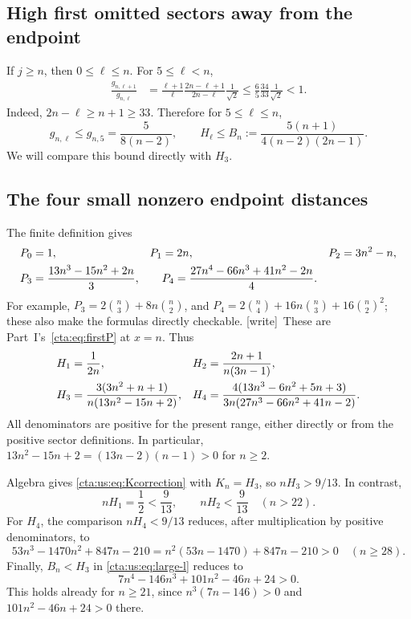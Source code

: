 \documentclass[11pt]{article}
\theoremstyle{definition}
\theoremstyle{remark}
\newcommand{\wtag}{\textup{[write]}}
\begin{document}
\subsection{High first omitted sectors away from the endpoint}
If $j\ge n$, then $0\le\ell\le n$. For $5\le\ell<n$,
\begin{align}\label{cta:us:eq:g-decreasing}
 \frac{g_{n,\ell+1}}{g_{n,\ell}}
 &=\frac{\ell+1}{\ell}\frac{2n-\ell+1}{2n-\ell}\frac1{\sqrt2}
 \le\frac65\frac{34}{33}\frac1{\sqrt2}<1.
\end{align}
Indeed, $2n-\ell\ge n+1\ge33$. Therefore for $5\le\ell\le n$,
\begin{equation}\label{cta:us:eq:large-l}
 g_{n,\ell}\le g_{n,5}=\frac5{8(n-2)},\qquad
 H_\ell\le B_n:=\frac{5(n+1)}{4(n-2)(2n-1)}.
\end{equation}
We will compare this bound directly with $H_3$.

\subsection{The four small nonzero endpoint distances}
The finite definition gives
\begin{align}\label{cta:us:eq:first-five}
 P_0&=1,& P_1&=2n,& P_2&=3n^2-n,\notag\\
 P_3&=\frac{13n^3-15n^2+2n}{3},&&
 P_4=\frac{27n^4-66n^3+41n^2-2n}{4}.
\end{align}
For example, $P_3=2\binom n3+8n\binom n2$, and
$P_4=2\binom n4+16n\binom n3+16\binom n2^2$;
these also make the formulas directly checkable.
\wtag\ These are Part~I's~\eqref{cta:eq:firstP} at $x=n$. Thus
\begin{align}\label{cta:us:eq:four-H}
 H_1&=\frac1{2n},&
 H_2&=\frac{2n+1}{n(3n-1)},\notag\\
 H_3&=\frac{3(3n^2+n+1)}{n(13n^2-15n+2)},&
 H_4&=\frac{4(13n^3-6n^2+5n+3)}
               {3n(27n^3-66n^2+41n-2)}.
\end{align}
All denominators are positive for the present range, either directly
or from the positive sector definitions. In particular,
$13n^2-15n+2=(13n-2)(n-1)>0$ for $n\ge2$.

Algebra gives \eqref{cta:us:eq:Kcorrection} with $K_n=H_3$, so
$nH_3>9/13$. In contrast,
\[
 nH_1=\frac12<\frac9{13},\qquad
 nH_2<\frac9{13}\quad(n>22).
\]
For $H_4$, the comparison $nH_4<9/13$ reduces, after multiplication
by positive denominators, to
\begin{equation}\label{cta:us:eq:H4positive}
 53n^3-1470n^2+847n-210
 =n^2(53n-1470)+847n-210>0\quad(n\ge28).
\end{equation}
Finally, $B_n<H_3$ in \eqref{cta:us:eq:large-l} reduces to
\begin{equation}\label{cta:us:eq:large-positive}
 7n^4-146n^3+101n^2-46n+24>0.
\end{equation}
This holds already for $n\ge21$, since
$n^3(7n-146)>0$ and $101n^2-46n+24>0$ there.
\end{document}

